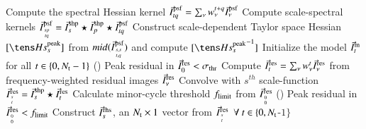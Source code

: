 \documentclass[11pt,a4paper]{article}
\begin{document}
\begin{algorithm}
  {
        { Compute the spectral Hessian kernel } $\vec{I}^{\rm psf}_{tq} = \sum_{\nu} {w_{\nu}^{t+q}} \vec{I}^{\rm psf}_{\nu}$\;
	{
		{Compute scale-spectral kernels} $\vec{I}^{\rm psf}_{{sp}\atop{tq}} = \vec{I}^{\rm shp}_s \star \vec{I}^{\rm shp}_p \star \vec{I}^{\rm psf}_{tq} $\;
	}
  }
  {
     Construct scale-dependent Taylor space Hessian $[{\He^{\rm peak}_s}]$ from $mid({\vec{I}}^{\rm psf}_{{s,s}\atop{t,q}})$ and compute $[{\He^{\rm peak}_s}^{-1}]$\;
  }
  Initialize the model $\vec{I}^{\rm m}_t$ for all $t \in \{0,N_{\rm t} -1\}$\; %
  \Repeat () { Peak residual in $\vec{I}^{\rm res}_0 < \sigma_{\rm thr}$ }
  {
    {
      Compute $\vec{I}^{\rm res}_t = \sum_{\nu} {w_{\nu}^t} \vec{I}^{\rm res}_{\nu}$ from frequency-weighted residual images ${\vec{I}}^{\rm res}_{\nu}$\;
      {
	    Convolve with $s^{th}$ scale-function $\vec{I}^{\rm res}_{{s}\atop{t}} = \vec{I}^{\rm shp}_s \star \vec{I}^{\rm res}_t$
      }
    }
    Calculate minor-cycle threshold $f_{\rm limit}$ from $\vec{I}^{\rm res}_{{0}\atop{0}}$\;
    \Repeat (){ Peak residual in $\vec{I}^{\rm res}_{{0}\atop{0}} < f_{\rm limit} $ } 
    {
     {
       {
          Construct ${\vec{I}}^{\rm rhs}_s$, an $N_{\rm t} \times 1$ vector from ${\vec{I}}^{\rm res}_{{s}\atop{t}} ~~\forall ~ t \in \{0,N_{\rm t} $-$1\}$\;
}}}}
\end{algorithm}
\end{document}
